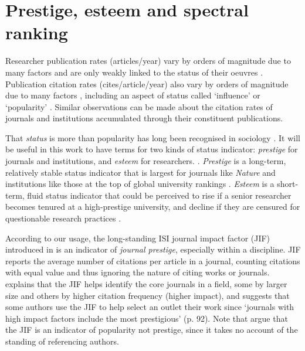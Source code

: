 \documentclass[10pt]{article}
\begin{document}
\section{Prestige, esteem and spectral ranking}
Researcher publication rates (articles/year) vary by orders of magnitude due to many factors and are only weakly linked to the status of their oeuvres \citep{ScientificOutputRecognition, ioannidisEvolvingPatternsExtreme2024a}. Publication citation rates (cites/article/year) also vary by orders of magnitude due to many factors \citep{tahamtanFactorsAffectingNumber2016, tahamtanWhatCitationCounts2019}, including an aspect of status called `influence' or `popularity' \citep{bollenJournalStatus2006a, garfieldeugeneCitationIndexingIts1979}. Similar observations can be made about the citation rates of journals and institutions accumulated through their constituent publications.

That \textit{status} is more than popularity has long been recognised in sociology \citep[e.g.][]{katzNewStatusIndex1953, podolny05}. It will be useful in this work to have terms for two kinds of status indicator: \textit{prestige} for journals and institutions, and \textit{esteem} for researchers. \citep[This distinction reflects discussions in, e.g., []{davisPrinciplesStratification1945, goodeCelebrationHeroesPrestige2022}. \textit{Prestige} is a long-term, relatively stable status indicator that is largest for journals like \textit{Nature} \citep{baldwinMakingNatureHistory2019} and institutions like those at the top of global university rankings \citep{aguilloComparingUniversityRankings2010}. \textit{Esteem} is a short-term, fluid status indicator that could be perceived to rise if a senior researcher becomes tenured at a high-prestige university, and decline if they are censured for questionable research practices \citep{aronsonGainLossEsteem1965, hassanibesheliGainLossEsteem2017}. 
    

According to our usage, the long-standing ISI journal impact factor (JIF) introduced in \cite{garfield1955, garfieldHistoryMeaningJournal2006} is an indicator of \textit{journal prestige}, especially within a discipline. JIF reports the average number of citations per article in a journal, counting citations with equal value and thus ignoring the nature of citing works or journals. \cite{garfieldHistoryMeaningJournal2006} explains that the JIF helps identify the core journals in a field, some by larger size and others by higher citation frequency (higher impact), and suggests that some authors use the JIF to help select an outlet their work since `journals with high impact factors include the most prestigious' (p. 92). Note that \cite{bollenJournalStatus2006a} argue that the JIF is an indicator of popularity not prestige, since it takes no account of the standing of referencing authors. 
 
\end{document}
